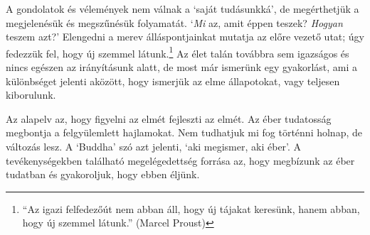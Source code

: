 A gondolatok és vélemények nem válnak a `saját tudásunkká', de
megérthetjük a megjelenésük és megszűnésük folyamatát. `\emph{Mi} az,
amit éppen teszek? \emph{Hogyan} teszem azt?' Elengedni a merev
álláspontjainkat mutatja az előre vezető utat; úgy fedezzük fel, hogy új
szemmel látunk.\footnote{``Az igazi felfedezőút nem abban áll, hogy új
  tájakat keresünk, hanem abban, hogy új szemmel látunk.'' (Marcel
  Proust)} Az élet talán továbbra sem igazságos és nincs egészen az
irányításunk alatt, de most már ismerünk egy gyakorlást, ami a
különbséget jelenti aközött, hogy ismerjük az elme állapotokat, vagy
teljesen kiborulunk.

Az alapelv az, hogy figyelni az elmét fejleszti az elmét. Az éber
tudatosság megbontja a felgyülemlett hajlamokat. Nem tudhatjuk mi fog
történni holnap, de változás lesz. A `Buddha' szó azt jelenti, `aki
megismer, aki éber'. A tevékenységekben található megelégedettség
forrása az, hogy megbízunk az éber tudatban és gyakoroljuk, hogy ebben
éljünk.
